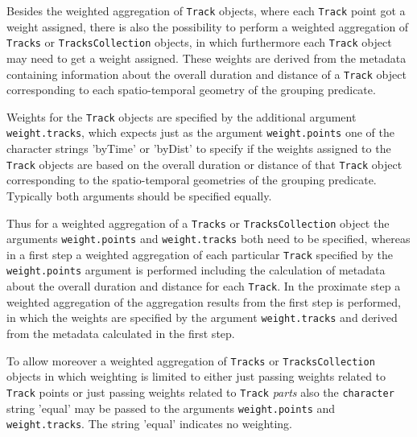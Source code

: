 \documentclass[12pt, oneside, a4paper]{scrbook}
\let\code=\texttt
\begin{document}
Besides the weighted aggregation of \code{Track} objects, where each \code{Track} point got a weight assigned, there is also the possibility to perform a weighted aggregation of \code{Tracks} or \code{TracksCollection} objects, in which furthermore each \code{Track} object may need to get a weight assigned. These weights are derived from the metadata containing information about the overall duration and distance of a \code{Track} object corresponding to each spatio-temporal geometry of the grouping predicate.
\par\medskip
Weights for the \code{Track} objects are specified by the additional argument \code{weight.tracks}, which expects just as the argument \code{weight.points} one of the character strings 'byTime' or 'byDist' to specify if the weights assigned to the \code{Track} objects are based on the overall duration or distance of that \code{Track} object corresponding to the spatio-temporal geometries of the grouping predicate. Typically both arguments should be specified equally.
\par\medskip
Thus for a weighted aggregation of a \code{Tracks} or \code{TracksCollection} object the arguments \code{weight.points} and \code{weight.tracks} both need to be specified, whereas in a first step a weighted aggregation of each particular \code{Track} specified by the \code{weight.points} argument is performed including the calculation of metadata about the overall duration and distance for each \code{Track}.
In the proximate step a weighted aggregation of the aggregation results from the first step is performed, in which the weights are specified by the argument \code{weight.tracks} and derived from the metadata calculated in the first step.
\par\medskip
To allow moreover a weighted aggregation of \code{Tracks} or \code{TracksCollection} objects in which weighting is limited to either just passing weights related to \code{Track} points or just passing weights related to \code{Track} \textit{parts} also the \code{character} string 'equal' may be passed to the arguments \code{weight.points} and \code{weight.tracks}. The string 'equal' indicates no weighting.
\par\medskip
\end{document}
